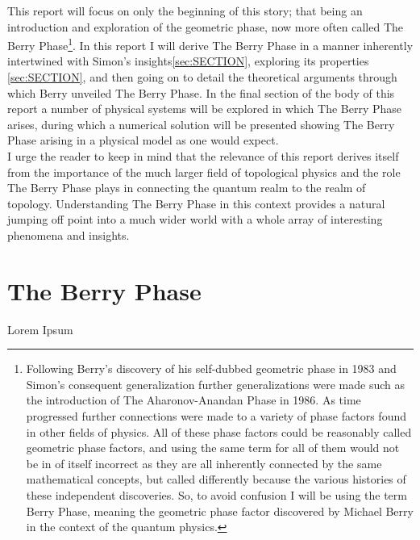 \documentclass{article}
\begin{document}
This report will focus on only the beginning of this story; that being an introduction and exploration of the geometric phase, now more often called The Berry Phase\footnote{Following Berry's discovery of his self-dubbed geometric phase in 1983 and Simon's consequent generalization further generalizations were made such as the introduction of The Aharonov-Anandan Phase in 1986. As time progressed further connections were made to a variety of phase factors found in other fields of physics. All of these phase factors could be reasonably called geometric phase factors, and using the same term for all of them would not be in of itself incorrect as they are all inherently connected by the same mathematical concepts, but called differently because the various histories of these independent discoveries. So, to avoid confusion I will be using the term Berry Phase, meaning the geometric phase factor discovered by Michael Berry in the context of the quantum physics.}.  In this report I will derive The Berry Phase in a manner inherently intertwined with Simon's insights\ref{sec:SECTION}, exploring its properties \ref{sec:SECTION}, and then going on to detail the theoretical arguments through which Berry unveiled The Berry Phase. In the final section of the body of this report a number of physical systems will be explored in which The Berry Phase arises, during which a numerical solution will be presented showing The Berry Phase arising in a physical model as one would expect.\\

I urge the reader to keep in mind that the relevance of this report derives itself from the importance of the much larger field of topological physics and the role The Berry Phase plays in connecting the quantum realm to the realm of topology. Understanding The Berry Phase in this context provides a natural jumping off point into a much wider world with a whole array of interesting phenomena and insights.

\section{The Berry Phase}
Lorem Ipsum


\end{document}
